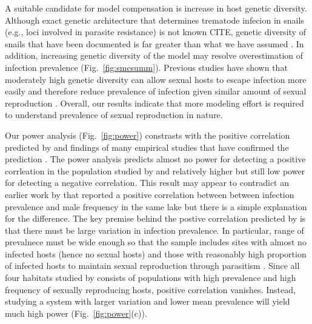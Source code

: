\documentclass{article}\usepackage[]{graphicx}\usepackage[]{color}
\newcommand{\fref}[1]{Fig.~\ref{fig:#1}}
\begin{document}
A suitable candidate for model compensation is increase in host genetic diversity.
Although exact genetic architecture that determines trematode infecion in snails (e.g., loci involved in parasite resistance) is not known {CITE}, genetic diversity of snails that have been documented is far greater than what we have assumed \citep{king2011parasites, dagan2013clonal}.
In addition, increasing genetic diversity of the model may resolve overestimation of infection prevalence (\fref{smcsumm}).
Previous studies have shown that moderately high genetic diversity can allow sexual hosts to escape infection more easily and therefore reduce prevalence of infection given similar amount of sexual reproduction \citep{lively2010effect, king2012does, ashby2015diversity}.
Overall, our results indicate that more modeling effort is required to understand prevalence of sexual reproduction in nature.

Our power analysis (\fref{power}) constrasts with the positive correlation predicted by \cite{lively1992parthenogenesis, lively2001trematode} and findings of many empirical studies that have confirmed the prediction \citep{lively1987evidence, lively2002temporal, kumpulainen2004parasites, vergara2013geographic, mckone2016fine}.
The power analysis predicts almost no power for detecting a positive corrleation in the population studied by \cite{vergara2014infection} and relatively higher but still low power for detecting a negative correlation.
This result may appear to contradict an earlier work by \cite{vergara2013geographic} that reported a positive correlation between between infection prevalence and male frequency in the same lake but there is a simple explanation for the difference.
The key premise behind the postive correlation predicted by \cite{lively2001trematode} is that there must be large variation in infection prevalence.
In particular, range of prevalnece must be wide enough so that the sample includes sites with almost no infected hosts (hence no sexual hosts) and those with reasonably high proportion of infected hosts to maintain sexual reproduction through parasitism \citep{lively2001trematode}.
Since all four habitats studied by \cite{vergara2014infection} consists of populations with high prevalence and high frequency of sexually reproducing hosts, positive correlation vanishes.
Instead, studying a system with larger variation and lower mean prevalence will yield much high power (\fref{power}(c)).
\end{document}
